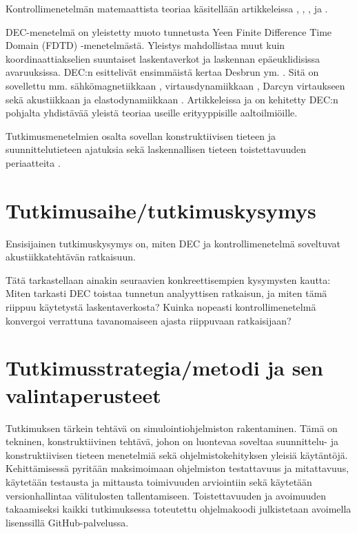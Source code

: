 \documentclass[utf8]{gradu3}
\begin{document}
Kontrollimenetelmän matemaattista teoriaa käsitellään artikkeleissa
\parencite{glowinski_ensuring_1992}, \parencite{lasiecka_exact_1989},
\parencite{lasiecka_exact_1989}, \parencite{lions_exact_1988}
ja \parencite{bristeau_controllability_1998}.

DEC-menetelmä on yleistetty muoto tunnetusta Yeen \parencite*{yee_numerical_1966}
Finite Difference Time Domain (FDTD) -menetelmästä.
Yleistys mahdollistaa muut kuin koordinaattiakselien suuntaiset laskentaverkot
ja laskennan epäeuklidisissa avaruuksissa.
DEC:n esittelivät ensimmäistä kertaa Desbrun ym. \parencite*{desbrun_discrete_2005}.
Sitä on sovellettu mm. sähkömagnetiikkaan
\parencite{bossavit_discretization_2005,rabina_numerical_2014,rabina_efficient_2015,monkola_discrete_2022},
virtausdynamiikkaan \parencite{nitschke_discrete_2017},
Darcyn virtaukseen \parencite{hirani_numerical_2015}
sekä akustiikkaan ja elastodynamiikkaan \parencite{vandekerckhove_mimetic_2014}.
Artikkeleissa \parencite{rabina_generalized_2018} ja \parencite{rossi_systematisation_2021}
on kehitetty DEC:n pohjalta yhdistävää yleistä teoriaa useille erityyppisille aaltoilmiöille.

Tutkimusmenetelmien osalta sovellan konstruktiivisen tieteen \parencite{kacprzyk_constructive_2010}
ja suunnittelutieteen \parencite{hevner_design_2004} ajatuksia
sekä laskennallisen tieteen toistettavuuden periaatteita \parencite{stodden_best_2013}.

\chapter{Tutkimusaihe/tutkimuskysymys}

Ensisijainen tutkimuskysymys on,
miten DEC ja kontrollimenetelmä soveltuvat akustiikkatehtävän ratkaisuun.

Tätä tarkastellaan ainakin seuraavien konkreettisempien kysymysten kautta:
Miten tarkasti DEC toistaa tunnetun analyyttisen ratkaisun,
ja miten tämä riippuu käytetystä laskentaverkosta?
Kuinka nopeasti kontrollimenetelmä konvergoi
verrattuna tavanomaiseen ajasta riippuvaan ratkaisijaan?

\chapter{Tutkimusstrategia/metodi ja sen valintaperusteet}

Tutkimuksen tärkein tehtävä on simulointiohjelmiston rakentaminen.
Tämä on tekninen, konstruktiivinen tehtävä, johon on luontevaa soveltaa
suunnittelu- ja konstruktiivisen tieteen menetelmiä
sekä ohjelmistokehityksen yleisiä käytäntöjä.
Kehittämisessä pyritään maksimoimaan ohjelmiston testattavuus ja mitattavuus,
käytetään testausta ja mittausta toimivuuden arviointiin
sekä käytetään versionhallintaa välitulosten tallentamiseen.
Toistettavuuden ja avoimuuden takaamiseksi kaikki tutkimuksessa toteutettu ohjelmakoodi
julkistetaan avoimella lisenssillä GitHub-palvelussa.
\end{document}
